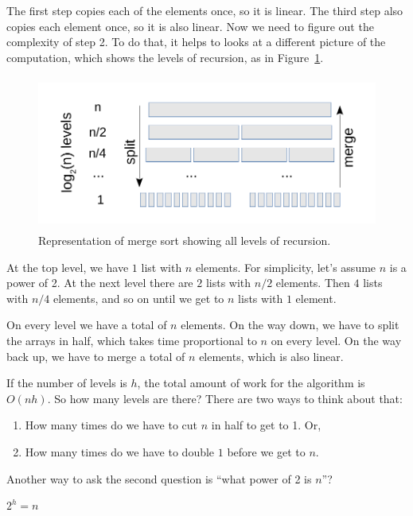 \documentclass[12pt]{book}
\theoremstyle{exercise}
\begin{document}
The first step copies each of the elements once, so it is linear. The
third step also copies each element once, so it is also linear. Now we
need to figure out the complexity of step 2. To do that, it helps to
looks at a different picture of the computation, which shows the levels
of recursion, as in Figure~\ref{fig-sort2}.

\begin{figure}
\centering
\includegraphics[height=2in]{figs/merge_sort2.pdf}
\caption{Representation of merge sort showing all levels of recursion.}
\label{fig-sort2}
\end{figure}

At the top level, we have $1$ list with $n$ elements. 
For simplicity, let's assume $n$ is a power of 2.
At the next level there are $2$ lists with $n/2$ elements.
Then $4$ lists with $n/4$ elements, and so on until we get
to $n$ lists with $1$ element.

On every level we have a total of $n$ elements. On the way down,
we have to split the arrays in half, which takes time proportional to
$n$ on every level. On the way back up, we have to merge a total
of $n$ elements, which is also linear.

If the number of levels is $h$, the total amount of work for the
algorithm is $O(nh)$. So how many levels are there? There are two
ways to think about that:

\begin{enumerate}

\item
  How many times do we have to cut $n$ in half to get to 1. Or,

\item
  How many times do we have to double $1$ before we get to $n$.

\end{enumerate}

Another way to ask the second question is ``what power of 2 is
$n$''?

$2^h = n$
\end{document}

